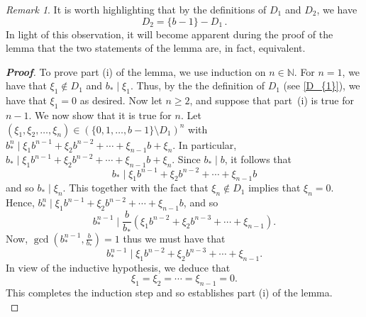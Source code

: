 \documentclass[12pt]{article}
\theoremstyle{definition}
\theoremstyle{remark}
\newtheorem{remark}{{Remark}}[section]
\begin{document}
\bigskip 


\begin{remark}
It is worth highlighting that by the definitions  of $D_{1} $ and $D_{2} $, we have 
\begin{equation}  \label{wedding}
    D_{2}=\{b-1\}-D_{1}   \, .
\end{equation}
In light of this observation, it will become apparent during the proof of the lemma that the two statements of the lemma are, in fact, equivalent. 
\end{remark}

\medskip 

\begin{proof}[\rm \textbf{Proof}]
To prove part (i) of the lemma,  we use  induction on $n\in\mathbb{N}$.   For $n=1$, we have that
$\xi_{1}\notin D_{1} $ and $b_{*}\mid\xi_{1}$. Thus,   by the  the definition  of $D_{1} $   (see \eqref{D_{1}}), we have that $\xi_{1}=0$ as desired. Now let $n\geq2$, and suppose that part~(i) is true for $n-1$. We now show  that it is true for $n$. Let $(\xi_{1},\xi_{2},\ldots,\xi_{n})\in(\{0,1,\ldots,b-1\}\setminus D_{1})^{n}$ with
$b_{*}^{n}\mid \xi_{1}b^{n-1}+\xi_{2}b^{n-2} +\cdots+\xi_{n-1}b+\xi_{n}$. In particular, $b_{*}\mid \xi_{1}b^{n-1}+\xi_{2}b^{n-2} +\cdots+\xi_{n-1}b+\xi_{n}$. Since $b_{*}\mid b$, it follows that
$$b_{*}\mid\xi_{1}b^{n-1}+\xi_{2}b^{n-2} +\cdots+\xi_{n-1}b$$
and so  $b_{*}\mid\xi_{n}$. This together with the fact that $\xi_{n}\notin D_{1}$ implies that   $\xi_{n}=0$. Hence, $b_{*}^{n}\mid \xi_{1}b^{n-1}+\xi_{2}b^{n-2} +\cdots+\xi_{n-1}b$, and so $$b_{*}^{n-1}\mid\frac{b}{b_{*}}( \xi_{1}b^{n-2}+\xi_{2}b^{n-3}+\cdots+\xi_{n-1}).$$ Now, $\gcd\left(b_{*}^{n-1},\frac{b}{b_{*}}\right)=1$
thus we must have that 
$$b_{*}^{n-1}\mid \xi_{1}b^{n-2}+\xi_{2}b^{n-3}+\cdots+\xi_{n-1}.$$
In view of the inductive hypothesis, we deduce that  $$\xi_{1}=\xi_{2}=\cdots=\xi_{n-1}=0.$$ This completes the induction step and so establishes  part (i) of the lemma.   \\



\end{proof}
\end{document}
